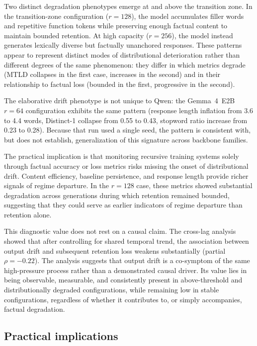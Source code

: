 \documentclass[a4paper,fleqn]{cas-dc}
\newif\ifshowchanges
\newcommand{\rev}[1]{\ifshowchanges{\color{blue}#1}\else{#1}\fi}
\begin{document}
\rev{Two distinct degradation phenotypes emerge at and above the transition zone. In the transition-zone configuration ($r=128$),} the model accumulates filler words and
repetitive function tokens while preserving enough factual content to maintain
bounded retention. At high capacity ($r=256$), the model instead generates
lexically diverse but factually unanchored responses. These patterns appear to
represent distinct modes of distributional deterioration rather than different
degrees of the same phenomenon: they differ in which metrics degrade (MTLD
collapses in the first case, increases in the second) and in their relationship
to factual loss (bounded in the first, progressive in the second).

The elaborative drift phenotype is not unique to Qwen: the Gemma~4~E2B $r=64$
configuration exhibits the same pattern (response length inflation from 3.6 to
4.4 words, Distinct-1 collapse from 0.55 to 0.43, stopword ratio increase from
0.23 to 0.28). \rev{Because that run used a single seed, the pattern is consistent with, but does not establish, generalization of this signature across backbone families.}

The practical implication is that monitoring recursive training systems solely
through factual accuracy or loss metrics risks missing the onset of
distributional drift. Content efficiency, baseline persistence, and response
length provide richer signals of regime departure. In the $r=128$ case, these
metrics showed substantial degradation across generations during which retention
remained bounded, suggesting that they could serve as earlier indicators of
regime departure than retention alone.

This diagnostic value does not rest on a causal claim. The
cross-lag analysis showed that after controlling for shared temporal trend, the
association between output drift and subsequent retention loss weakens
substantially (partial $\rho = -0.22$). The analysis suggests that output drift is a
co-symptom of the same high-pressure process rather than a demonstrated causal
driver. Its value lies in being observable, measurable, and consistently present
in above-threshold and distributionally degraded configurations, while remaining
low in stable configurations, regardless of whether it contributes to, or simply
accompanies, factual degradation.

\subsection{Practical implications}\label{sec:disc_practical}
\end{document}
